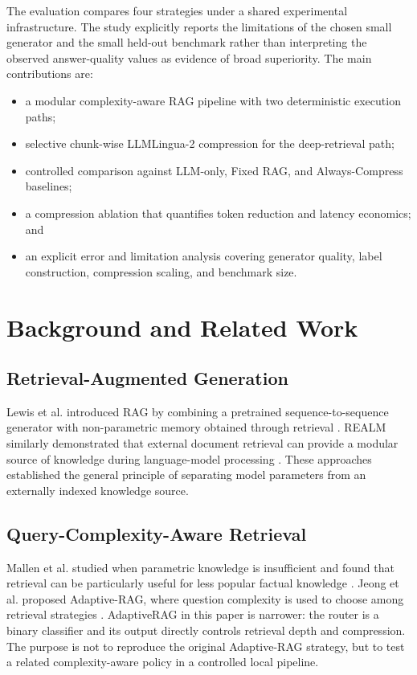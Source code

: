 \documentclass[conference]{IEEEtran}
\begin{document}
The evaluation compares four strategies under a shared experimental infrastructure. The study explicitly reports the limitations of the chosen small generator and the small held-out benchmark rather than interpreting the observed answer-quality values as evidence of broad superiority. The main contributions are:
\begin{itemize}
    \item a modular complexity-aware RAG pipeline with two deterministic execution paths;
    \item selective chunk-wise LLMLingua-2 compression for the deep-retrieval path;
    \item controlled comparison against LLM-only, Fixed RAG, and Always-Compress baselines;
    \item a compression ablation that quantifies token reduction and latency economics; and
    \item an explicit error and limitation analysis covering generator quality, label construction, compression scaling, and benchmark size.
\end{itemize}

\section{Background and Related Work}

\subsection{Retrieval-Augmented Generation}
Lewis et al. introduced RAG by combining a pretrained sequence-to-sequence generator with non-parametric memory obtained through retrieval \cite{lewis2020rag}. REALM similarly demonstrated that external document retrieval can provide a modular source of knowledge during language-model processing \cite{guu2020realm}. These approaches established the general principle of separating model parameters from an externally indexed knowledge source.

\subsection{Query-Complexity-Aware Retrieval}
Mallen et al. studied when parametric knowledge is insufficient and found that retrieval can be particularly useful for less popular factual knowledge \cite{mallen2023trust}. Jeong et al. proposed Adaptive-RAG, where question complexity is used to choose among retrieval strategies \cite{jeong2024adaptiverag}. AdaptiveRAG in this paper is narrower: the router is a binary classifier and its output directly controls retrieval depth and compression. The purpose is not to reproduce the original Adaptive-RAG strategy, but to test a related complexity-aware policy in a controlled local pipeline.
\end{document}
